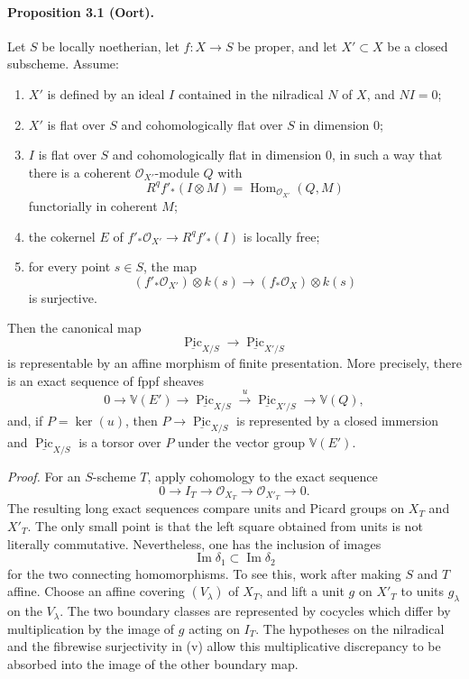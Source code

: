 \documentclass[12pt]{article}
\newcommand{\cO}{\mathcal O}
\newcommand{\Pic}{\operatorname{Pic}}
\newcommand{\Hom}{\operatorname{Hom}}
\newcommand{\xto}[1]{\xrightarrow{#1}}
\newcommand{\longto}{\longrightarrow}
\begin{document}
\paragraph{Proposition 3.1 (Oort).}
Let $S$ be locally noetherian, let $f:X\to S$ be proper, and let $X'\subset X$ be a closed subscheme. Assume:
\begin{enumerate}[label=\roman*)]
\item $X'$ is defined by an ideal $I$ contained in the nilradical $N$ of $X$, and $NI=0$;
\item $X'$ is flat over $S$ and cohomologically flat over $S$ in dimension $0$;
\item $I$ is flat over $S$ and cohomologically flat in dimension $0$, in such a way that there is a coherent $\cO_{X'}$-module $Q$ with
\[
R^qf'_*(I\otimes M)=\Hom_{\cO_{X'}}(Q,M)
\]
functorially in coherent $M$;
\item the cokernel $E$ of $f'_*\cO_{X'}\to R^qf'_*(I)$ is locally free;
\item for every point $s\in S$, the map
\[
(f'_*\cO_{X'})\otimes k(s)\longto (f_*\cO_X)\otimes k(s)
\]
is surjective.
\end{enumerate}
Then the canonical map
\[
\underline{\Pic}_{X/S}\longto \underline{\Pic}_{X'/S}
\]
is representable by an affine morphism of finite presentation. More precisely, there is an exact sequence of fppf sheaves
\[
0\to\mathbb V(E')\to\underline{\Pic}_{X/S}\xto{u}\underline{\Pic}_{X'/S}\to\mathbb V(Q),
\]
and, if $P=\ker(u)$, then $P\to\underline{\Pic}_{X/S}$ is represented by a closed immersion and $\underline{\Pic}_{X/S}$ is a torsor over $P$ under the vector group $\mathbb V(E')$.

\emph{Proof.}
For an $S$-scheme $T$, apply cohomology to the exact sequence
\[
0\to I_T\to\cO_{X_T}\to\cO_{X'_T}\to0.
\]
The resulting long exact sequences compare units and Picard groups on $X_T$ and $X'_T$. The only small point is that the left square obtained from units is not literally commutative. Nevertheless, one has the inclusion of images
\[
\operatorname{Im}\delta_1\subset\operatorname{Im}\delta_2
\]
for the two connecting homomorphisms. To see this, work after making $S$ and $T$ affine. Choose an affine covering $(V_\lambda)$ of $X_T$, and lift a unit $g$ on $X'_T$ to units $g_\lambda$ on the $V_\lambda$. The two boundary classes are represented by cocycles which differ by multiplication by the image of $g$ acting on $I_T$. The hypotheses on the nilradical and the fibrewise surjectivity in (v) allow this multiplicative discrepancy to be absorbed into the image of the other boundary map.
\end{document}

